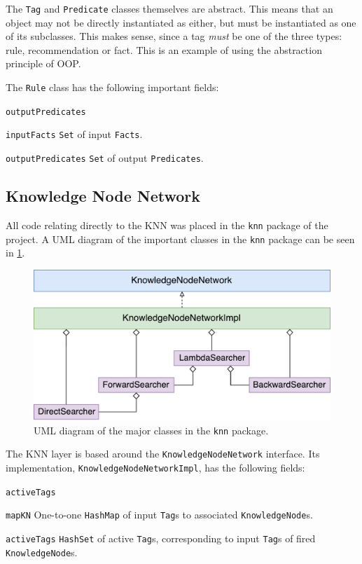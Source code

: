 \documentclass[titlepage,11pt]{article}
\newcommand{\code}[1]{\texttt{#1}}
\begin{document}
The \code{Tag} and \code{Predicate} classes themselves are abstract. This means that an object may not be directly instantiated as either, but must be instantiated as one of its subclasses. This makes sense, since a tag \emph{must} be one of the three types: rule, recommendation or fact. This is an example of using the abstraction principle of OOP.

The \code{Rule} class has the following important fields:

\begin{labeling}{\code{outputPredicates}}
	\item[\code{inputFacts}] \code{Set} of input \code{Facts}.
	\item[\code{outputPredicates}] \code{Set} of output \code{Predicates}.
\end{labeling}

\subsection{Knowledge Node Network}

All code relating directly to the KNN was placed in the \code{knn} package of the project. A UML diagram of the important classes in the \code{knn} package can be seen in \cref{fig:uml_knn}.

\begin{figure}[!htb]
	\includegraphics[width=\columnwidth]{figures/uml_knn.pdf}
	\caption{UML diagram of the major classes in the \code{knn} package.}
	\label{fig:uml_knn}
\end{figure}

The KNN layer is based around the \code{KnowledgeNodeNetwork} interface. Its implementation, \code{KnowledgeNodeNetworkImpl}, has the following fields:

\begin{labeling}{\code{activeTags}}
	\item[\code{mapKN}] One-to-one \code{HashMap} of input \code{Tag}s to associated \code{KnowledgeNode}s.
	\item[\code{activeTags}] \code{HashSet} of active \code{Tag}s, corresponding to input \code{Tag}s of fired \code{KnowledgeNode}s.
\end{labeling}
\end{document}
